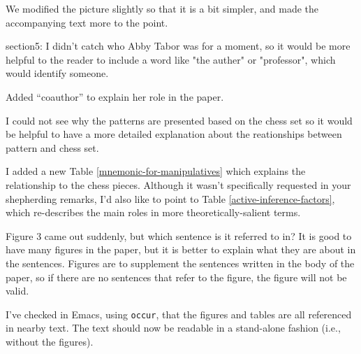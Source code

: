 \documentclass[acmlarge,timestamp]{acmart}
\begin{document}
\begin{rightbubbles}
We modified the picture slightly so that it is a bit simpler, and made
the accompanying text more to the point. {\large {}}
\end{rightbubbles}

\begin{leftbubbles}
section5: I didn't catch who Abby Tabor was for a moment, so it would be more helpful to the reader to include a word like "the auther" or "professor", which would identify someone.
\end{leftbubbles}

\begin{rightbubbles}
Added ``coauthor” to explain her role in the paper. {\large {}}
\end{rightbubbles}

\begin{leftbubbles}
I could not see why the patterns are presented based on the chess set
so it would be helpful to have a more detailed explanation about the
reationships between pattern and chess set.
\end{leftbubbles}

\begin{rightbubbles}
I added a new Table \ref{mnemonic-for-manipulatives} which explains
the relationship to the chess pieces.  Although it wasn’t specifically
requested in your shepherding remarks, I’d also like to point to Table
\ref{active-inference-factors}, which re-describes the main roles in
more theoretically-salient terms. {\large {}}
\end{rightbubbles}

\begin{leftbubbles}
Figure 3 came out suddenly, but which sentence is it referred to in? It is good to have many figures in the paper, but it is better to explain what they are about in the sentences. Figures are to supplement the sentences written in the body of the paper, so if there are no sentences that refer to the figure, the figure will not be valid.
\end{leftbubbles}

\begin{rightbubbles}
  I’ve checked in Emacs, using \texttt{occur}, that the figures and
  tables are all referenced in nearby text.  The text should now be
  readable in a stand-alone fashion (i.e., without the
  figures). {\large {}}
\end{rightbubbles}
\end{document}
